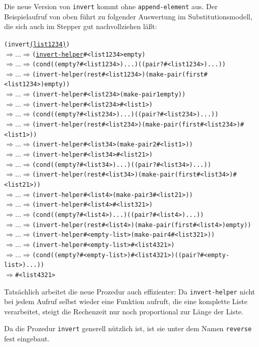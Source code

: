 Die neue Version von \texttt{invert} kommt ohne
\texttt{append-element} aus.  Der Beispielaufruf von oben führt zu
folgender Auswertung im Substitutionsmodell, die sich auch im Stepper
gut nachvollziehen läßt:
%
\begin{alltt}\small
(invert \underline{(list 1 2 3 4)})
\(\Longrightarrow\ldots\Longrightarrow\) (\underline{invert-helper} #<list 1 2 3 4> empty)
\(\Longrightarrow\ldots\Longrightarrow\) (cond ((empty? #<list 1 2 3 4>) ...) ((pair? #<list 1 2 3 4>) ...))
\(\Longrightarrow\ldots\Longrightarrow\) (invert-helper (rest #<list 1 2 3 4>) (make-pair (first #<list 1 2 3 4>) empty))
\(\Longrightarrow\ldots\Longrightarrow\) (invert-helper #<list 2 3 4> (make-pair 1 empty))
\(\Longrightarrow\ldots\Longrightarrow\) (invert-helper #<list 2 3 4> #<list 1>)
\(\Longrightarrow\ldots\Longrightarrow\) (cond ((empty? #<list 2 3 4>) ...) ((pair? #<list 2 3 4>) ...))
\(\Longrightarrow\ldots\Longrightarrow\) (invert-helper (rest #<list 2 3 4>) (make-pair (first #<list 2 3 4>) #<list 1>))
\(\Longrightarrow\ldots\Longrightarrow\) (invert-helper #<list 3 4> (make-pair 2 #<list 1>))
\(\Longrightarrow\ldots\Longrightarrow\) (invert-helper #<list 3 4> #<list 2 1>)
\(\Longrightarrow\ldots\Longrightarrow\) (cond ((empty? #<list 3 4>) ...) ((pair? #<list 3 4>) ...))
\(\Longrightarrow\ldots\Longrightarrow\) (invert-helper (rest #<list 3 4>) (make-pair (first #<list 3 4>) #<list 2 1>))
\(\Longrightarrow\ldots\Longrightarrow\) (invert-helper #<list 4> (make-pair 3 #<list 2 1>))
\(\Longrightarrow\ldots\Longrightarrow\) (invert-helper #<list 4> #<list 3 2 1>)
\(\Longrightarrow\ldots\Longrightarrow\) (cond ((empty? #<list 4>) ...) ((pair? #<list 4>) ...))
\(\Longrightarrow\ldots\Longrightarrow\) (invert-helper (rest #<list 4>) (make-pair (first #<list 4>) empty))
\(\Longrightarrow\ldots\Longrightarrow\) (invert-helper #<empty-list> (make-pair 4 #<list 3 2 1>))
\(\Longrightarrow\ldots\Longrightarrow\) (invert-helper #<empty-list> #<list 4 3 2 1>)
\(\Longrightarrow\ldots\Longrightarrow\) (cond ((empty? #<empty-list>) #<list 4 3 2 1>) ((pair? #<empty-list>) ...))
\(\Longrightarrow\) #<list 4 3 2 1>
\end{alltt}
%
Tatsächlich arbeitet die neue Prozedur auch effizienter: Da
\texttt{invert-helper} nicht bei jedem Aufruf selbst wieder eine Funktion
aufruft, die eine komplette Liste verarbeitet, steigt die Rechenzeit
nur noch proportional zur Länge der Liste.

Da die Prozedur \texttt{invert} generell nützlich ist, ist sie unter
dem Namen \texttt{reverse} fest eingebaut.

